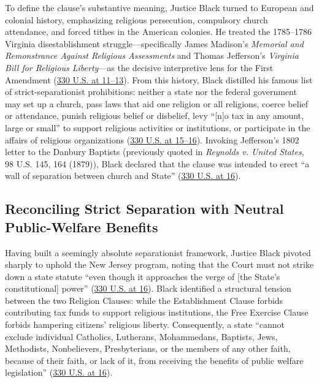 \documentclass[12pt]{article}
\begin{document}
To define the clause's substantive meaning, Justice Black turned to European and colonial history, emphasizing religious persecution, compulsory church attendance, and forced tithes in the American colonies. He treated the 1785--1786 Virginia disestablishment struggle---specifically James Madison's \emph{Memorial and Remonstrance Against Religious Assessments} and Thomas Jefferson's \emph{Virginia Bill for Religious Liberty}---as the decisive interpretive lens for the First Amendment (\href{https://supreme.justia.com/cases/federal/us/330/1/}{330 U.S. at 11--13}). From this history, Black distilled his famous list of strict-separationist prohibitions: neither a state nor the federal government may set up a church, pass laws that aid one religion or all religions, coerce belief or attendance, punish religious belief or disbelief, levy ``[n]o tax in any amount, large or small'' to support religious activities or institutions, or participate in the affairs of religious organizations (\href{https://supreme.justia.com/cases/federal/us/330/1/}{330 U.S. at 15--16}). Invoking Jefferson's 1802 letter to the Danbury Baptists (previously quoted in \emph{Reynolds v. United States}, 98 U.S. 145, 164 (1879)), Black declared that the clause was intended to erect ``a wall of separation between church and State'' (\href{https://supreme.justia.com/cases/federal/us/330/1/}{330 U.S. at 16}).

\subsection{Reconciling Strict Separation with Neutral Public-Welfare Benefits}

Having built a seemingly absolute separationist framework, Justice Black pivoted sharply to uphold the New Jersey program, noting that the Court must not strike down a state statute ``even though it approaches the verge of [the State's constitutional] power'' (\href{https://supreme.justia.com/cases/federal/us/330/1/}{330 U.S. at 16}). Black identified a structural tension between the two Religion Clauses: while the Establishment Clause forbids contributing tax funds to support religious institutions, the Free Exercise Clause forbids hampering citizens' religious liberty. Consequently, a state ``cannot exclude individual Catholics, Lutherans, Mohammedans, Baptists, Jews, Methodists, Nonbelievers, Presbyterians, or the members of any other faith, because of their faith, or lack of it, from receiving the benefits of public welfare legislation'' (\href{https://supreme.justia.com/cases/federal/us/330/1/}{330 U.S. at 16}).
\end{document}
